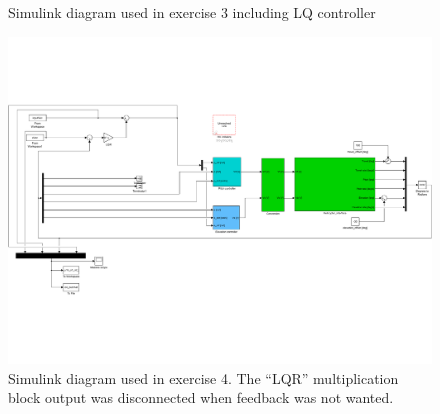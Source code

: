 \begin{appendices}
\begin{figure}[h]
    \caption{Simulink diagram used in exercise 3 including LQ controller}

    \label{fig:simulink_LQ}

\end{figure}



\begin{figure}[h]

    \includegraphics[width=\textwidth]{ex4sim.pdf}

    \caption{Simulink diagram used in exercise 4. The ``LQR'' multiplication block output was disconnected when feedback was not wanted.}

\end{figure}

\end{appendices}
